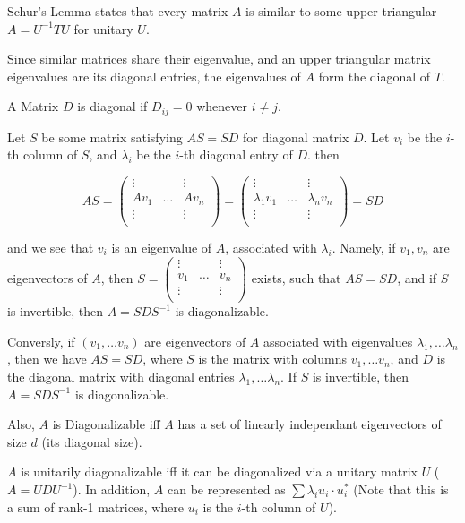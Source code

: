 Schur's Lemma states that every matrix $A$  is similar to some upper triangular $A=U^{-1}TU$ for unitary $U$.

Since similar matrices share their eigenvalue, and an upper triangular matrix eigenvalues are its diagonal entries, the eigenvalues of $A$ form the diagonal of $T$.

A Matrix $D$ is  diagonal if $D_{ij}=0$ whenever $i\neq j$. 

Let $S$ be some matrix satisfying $AS=SD$ for diagonal matrix $D$. Let $v_i$ be the $i$-th column of $S$, and $\lambda_i$ be the $i$-th diagonal entry of $D$.
then 

$$
AS=
\begin{pmatrix}
    \vdots & & \vdots \\
    Av_1 & \dots & Av_n \\
    \vdots & & \vdots \\ 
\end{pmatrix}
=
\begin{pmatrix}
    \vdots & & \vdots \\
    \lambda_1v_1 & \dots & \lambda_nv_n \\
    \vdots & & \vdots \\ 
\end{pmatrix}
=SD
$$

and we see that $v_i$ is an eigenvalue of $A$, associated with $\lambda_i$.
Namely, if $v_1,v_n$ are eigenvectors of $A$, then $S=\begin{pmatrix}
    \vdots & & \vdots \\
    v_1 & \dots & v_n \\
    \vdots & & \vdots \\ 
\end{pmatrix}$
exists, such that $AS=SD$, and if $S$ is invertible, then $A=SDS^{-1}$ is diagonalizable.


Conversly, if $(v_1,\dots v_n)$ are eigenvectors of $A$ associated with eigenvalues $\lambda_1,\dots \lambda_n$, then we have $AS=SD$, where $S$ is the matrix with columns $v_1,\dots v_n$, and $D$ is the diagonal matrix with diagonal entries $\lambda_1,\dots \lambda_n$. 
If $S$ is invertible, then $A=SDS^{-1}$ is diagonalizable.

Also, $A$ is Diagonalizable iff $A$ has a set of linearly independant eigenvectors of size $d$ (its diagonal size).


$A$ is unitarily diagonalizable iff it can be diagonalized via a unitary matrix $U$ ($A=UDU^{-1}$). In addition, $A$ can be represented as $ \sum{\lambda_i u_i \cdot u_i^*}$ (Note that this is a sum of rank-1 matrices, where $u_i$ is the $i$-th column of $U$).


